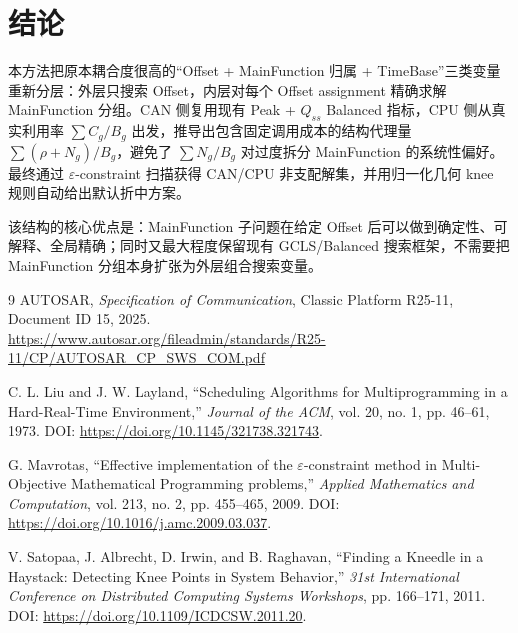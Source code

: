 \documentclass[11pt,a4paper,fontset=none]{ctexart}
\begin{document}
\section{结论}

本方法把原本耦合度很高的“Offset + MainFunction 归属 + TimeBase”三类变量重新分层：外层只搜索 Offset，内层对每个 Offset assignment 精确求解 MainFunction 分组。CAN 侧复用现有 Peak + $Q_{ss}$ Balanced 指标，CPU 侧从真实利用率 $\sum C_g/B_g$ 出发，推导出包含固定调用成本的结构代理量 $\sum(\rho+N_g)/B_g$，避免了 $\sum N_g/B_g$ 对过度拆分 MainFunction 的系统性偏好。最终通过 $\varepsilon$-constraint 扫描获得 CAN/CPU 非支配解集，并用归一化几何 knee 规则自动给出默认折中方案。

该结构的核心优点是：MainFunction 子问题在给定 Offset 后可以做到确定性、可解释、全局精确；同时又最大程度保留现有 GCLS/Balanced 搜索框架，不需要把 MainFunction 分组本身扩张为外层组合搜索变量。

\begin{thebibliography}{9}
AUTOSAR, \textit{Specification of Communication}, Classic Platform R25-11, Document ID 15, 2025.\\
\url{https://www.autosar.org/fileadmin/standards/R25-11/CP/AUTOSAR_CP_SWS_COM.pdf}

C. L. Liu and J. W. Layland, ``Scheduling Algorithms for Multiprogramming in a Hard-Real-Time Environment,'' \textit{Journal of the ACM}, vol. 20, no. 1, pp. 46--61, 1973. DOI: \url{https://doi.org/10.1145/321738.321743}.

G. Mavrotas, ``Effective implementation of the $\varepsilon$-constraint method in Multi-Objective Mathematical Programming problems,'' \textit{Applied Mathematics and Computation}, vol. 213, no. 2, pp. 455--465, 2009. DOI: \url{https://doi.org/10.1016/j.amc.2009.03.037}.

V. Satopaa, J. Albrecht, D. Irwin, and B. Raghavan, ``Finding a Kneedle in a Haystack: Detecting Knee Points in System Behavior,'' \textit{31st International Conference on Distributed Computing Systems Workshops}, pp. 166--171, 2011. DOI: \url{https://doi.org/10.1109/ICDCSW.2011.20}.
\end{thebibliography}
\end{document}

